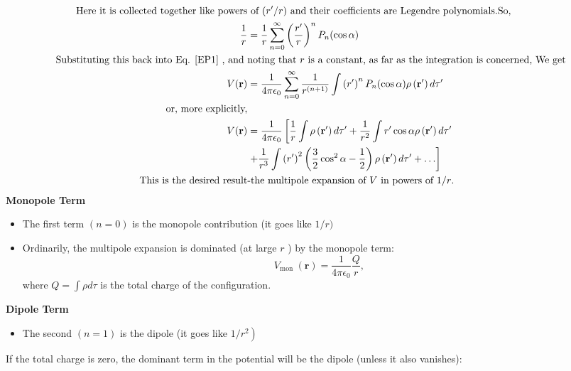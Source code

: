 \begin{align*}
\text{Here it is collected together like powers}&\text{  of $(r^\prime/r)$ and their coefficients are Legendre polynomials.So, }\\
\frac{1}{r}&=\frac{1}{r} \sum_{n=0}^{\infty}\left(\frac{r^{\prime}}{r}\right)^{n} P_{n}(\cos \alpha) \\
\text{Substituting this back into Eq. \ref{EP1} , and   }&\text{noting that $r$ is a constant, as far as the integration is concerned, We get}\\
V(\mathbf{r})&=\frac{1}{4 \pi \epsilon_{0}} \sum_{n=0}^{\infty} \frac{1}{r^{(n+1)}} \int\left(r^{\prime}\right)^{n} P_{n}(\cos \alpha) \rho\left(\mathbf{r}^{\prime}\right) d \tau^{\prime}\\
\text{or, more explicitly,}\\
V(\mathbf{r})&=\frac{1}{4 \pi \epsilon_{0}}\left[  \frac{1}{r} \int \rho\left(\mathbf{r}^{\prime}\right) d \tau^{\prime}+\frac{1}{r^{2}} \int r^{\prime} \cos \alpha \rho\left(\mathbf{r}^{\prime}\right) d \tau^{\prime}\right.  \\
&\left.+\frac{1}{r^{3}} \int\left(r^{\prime}\right)^{2}\left(\frac{3}{2} \cos ^{2} \alpha-\frac{1}{2}\right) \rho\left(\mathbf{r}^{\prime}\right) d \tau^{\prime}+\ldots\right] \\
\text{This is the desired result}&\text{-the multipole expansion of $V$ in powers of $1/r$.}
\end{align*}
\textbf{Monopole Term}
\begin{itemize}
	\item The first term $(n=0)$ is the monopole contribution (it goes like $1 / r)$
\item	Ordinarily, the multipole expansion is dominated (at large $r$ ) by the monopole term:
	$$
	V_{\text {mon }}(\mathbf{r})=\frac{1}{4 \pi \epsilon_{0}} \frac{Q}{r},
	$$
	where $Q=\int \rho d \tau$ is the total charge of the configuration.
\end{itemize}
\textbf{Dipole Term}
\begin{itemize}
	\item The second $(n=1)$ is the dipole (it goes like $\left.1 / r^{2}\right)$
\end{itemize}
If the total charge is zero, the dominant term in the potential will be the dipole (unless it also vanishes):
